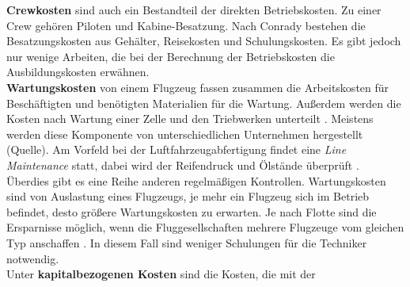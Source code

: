 %
\textbf{Crewkosten} sind auch ein Bestandteil der direkten Betriebskosten. Zu einer Crew gehören Piloten und Kabine-Besatzung.
Nach Conrady \cite{conrady2019luftverkehr} bestehen die Besatzungskosten aus Gehälter, Reisekosten und Schulungskosten.
Es gibt jedoch nur wenige Arbeiten, die bei der Berechnung der Betriebskosten die Ausbildungskosten erwähnen. \\
%
\textbf{Wartungskosten} von einem Flugzeug fassen zusammen die Arbeitskosten für Beschäftigten und benötigten Materialien für die Wartung.
Außerdem werden die Kosten nach Wartung einer Zelle und den Triebwerken unterteilt \cite{wang2021research}. 
Meistens werden diese Komponente von unterschiedlichen Unternehmen hergestellt (Quelle).
Am Vorfeld bei der Luftfahrzeugabfertigung findet eine \textit{Line Maintenance} statt, dabei wird der Reifendruck und Ölstände überprüft \cite{conrady2019luftverkehr}. 
Überdies gibt es eine Reihe anderen regelmäßigen Kontrollen.
Wartungskosten sind von Auslastung eines Flugzeugs, je mehr ein Flugzeug sich im Betrieb befindet, desto größere
Wartungskosten zu erwarten. %
%
%
Je nach Flotte sind die Ersparnisse möglich, wenn die Fluggesellschaften mehrere Flugzeuge vom gleichen Typ anschaffen \cite{conrady2019luftverkehr}. 
In diesem Fall sind weniger Schulungen für die Techniker notwendig.\\
%
%
%
%
%
Unter \textbf{kapitalbezogenen Kosten} sind die Kosten, die mit der 

